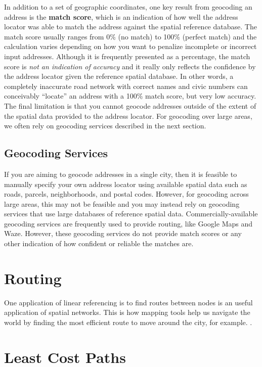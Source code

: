 \documentclass[
]{book}
\begin{document}
In addition to a set of geographic coordinates, one key result from geocoding an address is the \textbf{match score}, which is an indication of how well the address locator was able to match the address against the spatial reference database. The match score usually ranges from 0\% (no match) to 100\% (perfect match) and the calculation varies depending on how you want to penalize incomplete or incorrect input addresses. Although it is frequently presented as a percentage, the match score is \emph{not an indication of accuracy} and it really only reflects the confidence by the address locator given the reference spatial database. In other words, a completely inaccurate road network with correct names and civic numbers can conceivably ``locate'' an address with a 100\% match score, but very low accuracy. The final limitation is that you cannot geocode addresses outside of the extent of the spatial data provided to the address locator. For geocoding over large areas, we often rely on geocoding services described in the next section.

\subsection{Geocoding Services}\label{geocoding-services}

If you are aiming to geocode addresses in a single city, then it is feasible to manually specify your own address locator using available spatial data such as roads, parcels, neighborhoods, and postal codes. However, for geocoding across large areas, this may not be feasible and you may instead rely on geocoding services that use large databases of reference spatial data. Commercially-available geocoding services are frequently used to provide routing, like Google Maps and Waze. However, these geocoding services do not provide match scores or any other indication of how confident or reliable the matches are.

\section{Routing}\label{routing}

One application of linear referencing is to find routes between nodes is an useful application of spatial networks. This is how mapping tools help us navigate the world by finding the most efficient route to move around the city, for example. \citep{systems_innovation_network_2015}.

\section{Least Cost Paths}\label{least-cost-paths}
\end{document}
